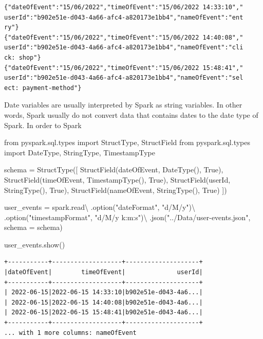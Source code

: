 \documentclass[
  11pt,
  letterpaper,
  DIV=11,
  numbers=noendperiod]{scrreprt}
\newenvironment{Shaded}{\begin{snugshade}}{\end{snugshade}}
\newcommand{\ImportTok}[1]{\textcolor[rgb]{0.00,0.46,0.62}{#1}}
\newcommand{\NormalTok}[1]{\textcolor[rgb]{0.00,0.23,0.31}{#1}}
\newcommand{\OperatorTok}[1]{\textcolor[rgb]{0.37,0.37,0.37}{#1}}
\newcommand{\StringTok}[1]{\textcolor[rgb]{0.13,0.47,0.30}{#1}}
\newcommand{\VariableTok}[1]{\textcolor[rgb]{0.07,0.07,0.07}{#1}}
\begin{document}
\begin{verbatim}
{"dateOfEvent":"15/06/2022","timeOfEvent":"15/06/2022 14:33:10","
userId":"b902e51e-d043-4a66-afc4-a820173e1bb4","nameOfEvent":"ent
ry"}
{"dateOfEvent":"15/06/2022","timeOfEvent":"15/06/2022 14:40:08","
userId":"b902e51e-d043-4a66-afc4-a820173e1bb4","nameOfEvent":"cli
ck: shop"}
{"dateOfEvent":"15/06/2022","timeOfEvent":"15/06/2022 15:48:41","
userId":"b902e51e-d043-4a66-afc4-a820173e1bb4","nameOfEvent":"sel
ect: payment-method"}
\end{verbatim}

Date variables are usually interpreted by Spark as string variables. In
other words, Spark usually do not convert data that contains dates to
the date type of Spark. In order to Spark

\begin{Shaded}
\begin{Highlighting}[]
\ImportTok{from}\NormalTok{ pyspark.sql.types }\ImportTok{import}\NormalTok{ StructType, StructField}
\ImportTok{from}\NormalTok{ pyspark.sql.types }\ImportTok{import}\NormalTok{ DateType, StringType, TimestampType}

\NormalTok{schema }\OperatorTok{=}\NormalTok{ StructType([}
\NormalTok{  StructField(}\StringTok{\textquotesingle{}dateOfEvent\textquotesingle{}}\NormalTok{, DateType(), }\VariableTok{True}\NormalTok{),}
\NormalTok{  StructField(}\StringTok{\textquotesingle{}timeOfEvent\textquotesingle{}}\NormalTok{, TimestampType(), }\VariableTok{True}\NormalTok{),}
\NormalTok{  StructField(}\StringTok{\textquotesingle{}userId\textquotesingle{}}\NormalTok{, StringType(), }\VariableTok{True}\NormalTok{),}
\NormalTok{  StructField(}\StringTok{\textquotesingle{}nameOfEvent\textquotesingle{}}\NormalTok{, StringType(), }\VariableTok{True}\NormalTok{)}
\NormalTok{])}

\NormalTok{user\_events }\OperatorTok{=}\NormalTok{ spark.read}\OperatorTok{\textbackslash{}}
\NormalTok{  .option(}\StringTok{"dateFormat"}\NormalTok{, }\StringTok{"d/M/y"}\NormalTok{)}\OperatorTok{\textbackslash{}}
\NormalTok{  .option(}\StringTok{"timestampFormat"}\NormalTok{, }\StringTok{"d/M/y k:m:s"}\NormalTok{)}\OperatorTok{\textbackslash{}}
\NormalTok{  .json(}\StringTok{"../Data/user{-}events.json"}\NormalTok{, schema }\OperatorTok{=}\NormalTok{ schema)}
  
\NormalTok{user\_events.show()}
\end{Highlighting}
\end{Shaded}

\begin{verbatim}
+-----------+-------------------+--------------------+
|dateOfEvent|        timeOfEvent|              userId|
+-----------+-------------------+--------------------+
| 2022-06-15|2022-06-15 14:33:10|b902e51e-d043-4a6...|
| 2022-06-15|2022-06-15 14:40:08|b902e51e-d043-4a6...|
| 2022-06-15|2022-06-15 15:48:41|b902e51e-d043-4a6...|
+-----------+-------------------+--------------------+
... with 1 more columns: nameOfEvent
\end{verbatim}
\end{document}
